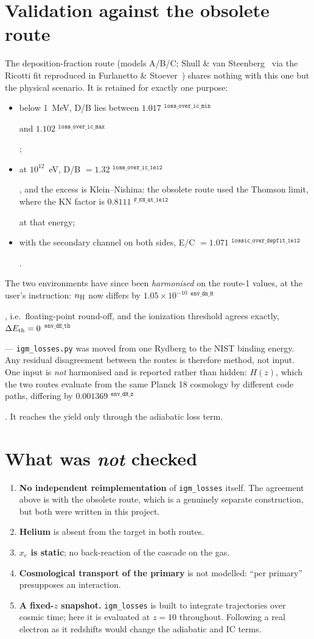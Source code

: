\documentclass[11pt,a4paper]{article}
\newif\ifprovdraft
\newcommand{\src}[1]{%
  \ifprovdraft
    \ifmmode{}^{\text{\color{gray}\scriptsize\texttt{#1}}}%
    \else{\color{gray}\scriptsize$^{\texttt{#1}}$}%
    \fi
  \fi}
\begin{document}
\section{Validation against the obsolete route}
The deposition-fraction route (models A/B/C; Shull \& van
Steenberg~\cite{svds} via the Ricotti fit reproduced in Furlanetto \&
Stoever~\cite{fs10}) shares nothing with this one but the physical scenario. It
is retained for exactly one purpose:
\begin{itemize}\itemsep1pt
\item below 1~MeV, D/B lies between $1.017$\src{loss\_over\_ic\_min} and
      $1.102$\src{loss\_over\_ic\_max};
\item at $10^{12}$~eV, D/B $= 1.32$\src{loss\_over\_ic\_1e12}, and the excess is
      Klein--Nishina: the obsolete route used the Thomson limit, where the KN
      factor is $0.8111$\src{F\_KN\_at\_1e12} at that energy;
\item with the secondary channel on both sides, E/C $= 1.071$\src{lossic\_over\_depfit\_1e12}.
\end{itemize}
The two environments have since been \emph{harmonised} on the route-1 values,
at the user's instruction: $n_{\rm H}$ now differs by
$1.05\times10^{-10}$\src{env\_dn\_H}, i.e.\ floating-point round-off, and the
ionization threshold agrees exactly, $\Delta E_{\rm th} = 0$\src{env\_dE\_th}
--- \texttt{igm\_losses.py} was moved from one Rydberg to the NIST binding
energy. Any residual disagreement between the routes is therefore method, not
input. One input is \emph{not} harmonised and is reported rather than hidden:
$H(z)$, which the two routes evaluate from the same Planck 18 cosmology by
different code paths, differing by $0.001369$\src{env\_dH\_z}. It reaches the
yield only through the adiabatic loss term.

\section{What was \emph{not} checked}
\begin{enumerate}\itemsep2pt
\item \textbf{No independent reimplementation} of \texttt{igm\_losses} itself.
      The agreement above is with the obsolete route, which is a genuinely
      separate construction, but both were written in this project.
\item \textbf{Helium} is absent from the target in both routes.
\item \textbf{$x_e$ is static}; no back-reaction of the cascade on the gas.
\item \textbf{Cosmological transport of the primary} is not modelled: ``per
      primary'' presupposes an interaction.
\item \textbf{A fixed-$z$ snapshot.} \texttt{igm\_losses} is built to integrate
      trajectories over cosmic time; here it is evaluated at $z=10$ throughout.
      Following a real electron as it redshifts would change the adiabatic and
      IC terms.
\end{enumerate}
\end{document}

